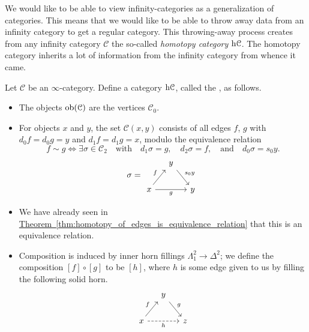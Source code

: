 \documentclass[main.tex]{subfiles}
\begin{document}
We would like to be able to view infinity-categories as a generalization of categories. This means that we would like to be able to throw away data from an infinity category to get a regular category. This throwing-away process creates from any infinity category $\mathcal{C}$ the so-called \emph{homotopy category} $\mathrm{h} \mathcal{C}$. The homotopy category inherits a lot of information from the infinity category from whence it came.

\begin{definition}
  \label{def:homotopy_category}
  Let $\mathcal{C}$ be an $\infty$-category. Define a category $\mathrm{h}\mathcal{C}$, called the , as follows.
  \begin{itemize}
    \item The objects $\operatorname{\mathrm{ob}}(\mathcal{C})$ are the vertices $\mathcal{C}_{0}$.

    \item For objects $x$ and $y$, the set $\mathcal{C}(x, y)$ consists of all edges $f$, $g$ with $d_{0}f = d_{0}g = y$ and $d_{1}f = d_{1}g = x$, modulo the equivalence relation
      \begin{equation*}
        f \sim g \iff \exists \sigma \in \mathcal{C}_{2}\quad \text{with}\quad d_{1}\sigma = g,\quad d_{2}\sigma = f, \quad \text{and}\quad d_{0}\sigma = s_{0}y.
      \end{equation*}
      \begin{equation*}
        \sigma =
        \begin{tikzcd}[column sep=small]
          & y
          \arrow[dr, "s_{0}y"]
          \\
          x
          \arrow[rr, swap, "g"]
          \arrow[ur, "f"]
          && y
        \end{tikzcd}
      \end{equation*}

    \item We have already seen in \hyperref[thm:homotopy_of_edges_is_equivalence_relation]{Theorem~\ref*{thm:homotopy_of_edges_is_equivalence_relation}} that this is an equivalence relation.

    \item Composition is induced by inner horn fillings $\Lambda^{2}_{1} \to \Delta^{2}$; we define the composition $[f] \circ [g]$ to be $[h]$, where $h$ is some edge given to us by filling the following solid horn.
      \begin{equation*}
        \begin{tikzcd}[column sep=small]
          & y
          \arrow[dr, "g"]
          \\
          x
          \arrow[ur, "f"]
          \arrow[rr, dashed, swap, "h"]
          && z
        \end{tikzcd}
      \end{equation*}


\end{itemize}
\end{definition}
\end{document}
